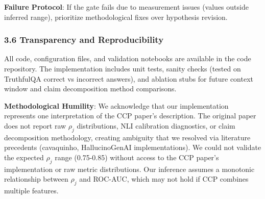 \textbf{Failure Protocol}: If the gate fails due to measurement issues (values outside inferred range), prioritize methodological fixes over hypothesis revision.

\subsubsection{3.6 Transparency and Reproducibility}

All code, configuration files, and validation notebooks are available in the code repository. The implementation includes unit tests, sanity checks (tested on TruthfulQA correct vs incorrect answers), and ablation stubs for future context window and claim decomposition method comparisons.

\textbf{Methodological Humility}: We acknowledge that our implementation represents one interpretation of the CCP paper's description. The original paper does not report raw $\rho_j$ distributions, NLI calibration diagnostics, or claim decomposition methodology, creating ambiguity that we resolved via literature precedents (cavaquinho, HallucinoGenAI implementations). We could not validate the expected $\rho_j$ range (0.75-0.85) without access to the CCP paper's implementation or raw metric distributions. Our inference assumes a monotonic relationship between $\rho_j$ and ROC-AUC, which may not hold if CCP combines multiple features.
